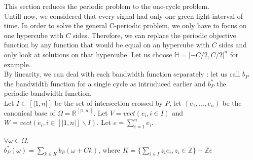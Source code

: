 This section reduces the periodic problem to the one-cycle problem.\\
Untill now, we considered that every signal had only one green light interval of time. In order to solve the general C-periodic problem, we only have to focus on one hypercube with $C$ sides. Therefore, we can replace the periodic objective function by any function that would be equal on an hypercube with $C$ sides and only look at solutions on that hypercube. Let us choose $\mathbb{H} = [-C/2, C/2[^n$ for example.\\
By linearity, we can deal with each bandwidth function separately : let us call $b_P$ the bandwidth function for a single cycle as intruduced earlier and $b^*_P$ the periodic bandwidth function. \\
Let $I \subset [|1,n|]$ be the set of intersection crossed by $P$, let $(e_1,...,e_n)$ be the canonical base of $\Omega = \mathbb{R}^{[|1,n|]}$. Let $V = vect({e_i, i \in I})$ and $W = vect({e_i, i \in [|1,n|]\backslash I})$. Let $e = \sum\limits_{i=1}^{n}e_i$. \\
\begin{lemma}
$\forall \omega \in \Omega$,\\
$b^*_P(\omega) = \sum\limits_{k \in K} b_P(\omega + Ck)$,
where $K = \{\sum\limits_{i \in I}z_i e_i, z_i \in \mathbb{Z}\} - \mathbb{Z}e$
\end{lemma}
